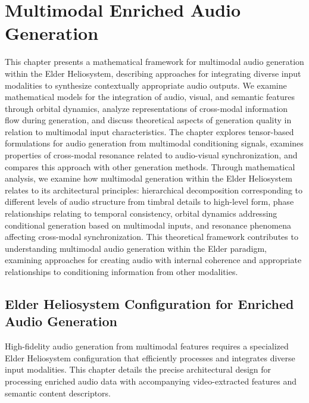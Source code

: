\chapter{Multimodal Enriched Audio Generation}

\begin{tcolorbox}[colback=blue!5!white,colframe=blue!75!black,title=Chapter Summary]
This chapter presents a mathematical framework for multimodal audio generation within the Elder Heliosystem, describing approaches for integrating diverse input modalities to synthesize contextually appropriate audio outputs. We examine mathematical models for the integration of audio, visual, and semantic features through orbital dynamics, analyze representations of cross-modal information flow during generation, and discuss theoretical aspects of generation quality in relation to multimodal input characteristics. The chapter explores tensor-based formulations for audio generation from multimodal conditioning signals, examines properties of cross-modal resonance related to audio-visual synchronization, and compares this approach with other generation methods. Through mathematical analysis, we examine how multimodal generation within the Elder Heliosystem relates to its architectural principles: hierarchical decomposition corresponding to different levels of audio structure from timbral details to high-level form, phase relationships relating to temporal consistency, orbital dynamics addressing conditional generation based on multimodal inputs, and resonance phenomena affecting cross-modal synchronization. This theoretical framework contributes to understanding multimodal audio generation within the Elder paradigm, examining approaches for creating audio with internal coherence and appropriate relationships to conditioning information from other modalities.
\end{tcolorbox}

\section{Elder Heliosystem Configuration for Enriched Audio Generation}

High-fidelity audio generation from multimodal features requires a specialized Elder Heliosystem configuration that efficiently processes and integrates diverse input modalities. This chapter details the precise architectural design for processing enriched audio data with accompanying video-extracted features and semantic content descriptors.

